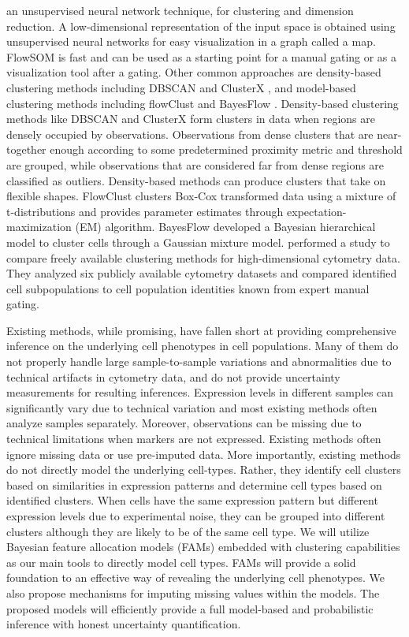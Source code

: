 \documentclass[12pt,]{article}
\begin{document}
an unsupervised neural network technique, for clustering and dimension
reduction. A low-dimensional representation of the input space is obtained
using unsupervised neural networks for easy visualization in a graph called a
map.  FlowSOM is fast and can be used as a starting point for a manual gating
or as a visualization tool after a gating.  Other common approaches are
density-based clustering methods including DBSCAN \citep{ester1996density} and
ClusterX \citep{chen2016cytofkit}, and  model-based clustering methods including
flowClust \citep{lo2009flowclust} and BayesFlow \citep{johnsson2016bayesflow}.
Density-based clustering methods like DBSCAN and ClusterX form clusters in data
when regions are densely occupied by observations. Observations from dense
clusters that are near-together enough according to some predetermined
proximity metric and threshold are grouped, while observations that are
considered far from dense regions are classified as outliers. Density-based
methods can produce clusters that take on flexible shapes. FlowClust clusters
Box-Cox transformed data using a mixture of t-distributions and provides
parameter estimates through expectation-maximization (EM) algorithm. BayesFlow
developed a Bayesian hierarchical model to cluster cells through a Gaussian
mixture model.  \cite{weber2016comparison} performed a study to compare freely
available clustering methods for high-dimensional cytometry data.  They
analyzed six publicly available cytometry datasets and compared identified cell
subpopulations to cell population identities known from expert manual gating. 


Existing methods, while promising, have fallen short at providing comprehensive
inference on the underlying cell phenotypes in cell populations.  Many of them
do not properly handle large sample-to-sample variations and abnormalities due
to technical artifacts in cytometry data, and do not provide uncertainty
measurements for resulting inferences.  Expression levels in different samples
can significantly vary due to technical variation and most existing methods
often analyze samples separately.  Moreover, observations can be missing due to
technical limitations when markers are not expressed.  Existing methods often
ignore missing data or use pre-imputed data.  More importantly, existing methods
do not directly model the underlying cell-types.  Rather, they identify cell
clusters based on similarities in expression patterns and determine cell types
based on identified clusters. When cells have the same expression pattern but
different expression levels due to experimental noise, they can be grouped into
different clusters although they are likely to be of the same cell type.  We
will utilize Bayesian feature allocation models (FAMs) embedded with clustering
capabilities as our main tools to directly model cell types. FAMs will provide
a solid foundation to an effective way of revealing the underlying cell
phenotypes. We also propose mechanisms for imputing missing values within the
models. The proposed models will efficiently provide a full model-based and
probabilistic inference with honest uncertainty quantification.
\end{document}
